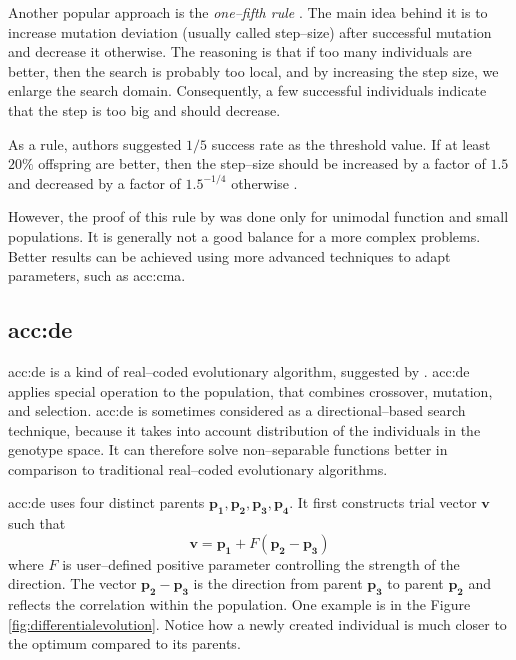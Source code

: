 Another popular approach is the \emph{one--fifth rule} \citep{onefifthrule}. The main idea behind it is to increase mutation deviation (usually called step--size) after successful mutation and decrease it otherwise. The reasoning is that if too many individuals are better, then the search is probably too local, and by increasing the step size, we enlarge the search domain. Consequently, a few successful individuals indicate that the step is too big and should decrease.

As a rule, authors \citet*{onefifthruleoriginal} suggested $1/5$ success rate as the threshold value. If at least $20\%$ offspring are better, then the step--size should be increased by a factor of $1.5$ and decreased by a factor of $1.5^{-1/4}$ otherwise \citep{onefifthrule}.

However, the proof of this rule by \citeauthor*{onefifthruleoriginal} was done only for unimodal function and small populations. It is generally not a good balance for a more complex problems. Better results can be achieved using more advanced techniques to adapt parameters, such as \acrshort{acc:cma}.

\subsection{\texorpdfstring{\acrlong*{acc:de}}{Differential Evolution}}

\acrfull{acc:de} is a kind of real--coded evolutionary algorithm, suggested by \citet*{differentialevolutionoriginal}. \acrshort{acc:de} applies special operation to the population, that combines crossover, mutation, and selection. \acrshort{acc:de} is sometimes considered as a directional--based search technique, because it takes into account distribution of the individuals in the genotype space. It can therefore solve non--separable func\-tions better in comparison to traditional real--coded evolutionary algorithms.

\acrshort{acc:de} uses four distinct parents $\mathbf{p_1}, \mathbf{p_2}, \mathbf{p_3}, \mathbf{p_4}$. It first constructs trial vector $\mathbf{v}$ such that
$$
\mathbf{v} = \mathbf{p_1} + F\left( \mathbf{p_2} - \mathbf{p_3} \right)
$$
where $F$ is user--defined positive parameter controlling the strength of the direction. The vector $\mathbf{p_2} - \mathbf{p_3}$ is the direction from parent $\mathbf{p_3}$ to parent $\mathbf{p_2}$ and reflects the correlation within the population. One example is in the Figure \ref{fig:differentialevolution}. Notice how a newly created individual is much closer to the optimum compared to its parents.

